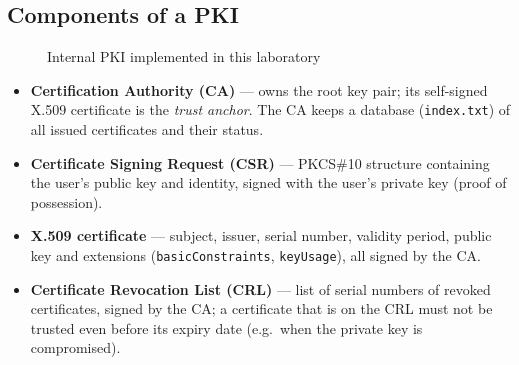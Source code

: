 \documentclass[12pt,a4paper]{article}
\begin{document}
\subsection{Components of a PKI}
\begin{figure}[H]
\centering
{}
\caption{Internal PKI implemented in this laboratory}
\end{figure}

\begin{itemize}
  \item \textbf{Certification Authority (CA)} — owns the root key pair; its self-signed X.509
        certificate is the \emph{trust anchor}. The CA keeps a database (\texttt{index.txt}) of all
        issued certificates and their status.
  \item \textbf{Certificate Signing Request (CSR)} — PKCS\#10 structure containing the user's
        public key and identity, signed with the user's private key (proof of possession).
  \item \textbf{X.509 certificate} — subject, issuer, serial number, validity period, public key and
        extensions (\texttt{basicConstraints}, \texttt{keyUsage}), all signed by the CA.
  \item \textbf{Certificate Revocation List (CRL)} — list of serial numbers of revoked
        certificates, signed by the CA; a certificate that is on the CRL must not be trusted even
        before its expiry date (e.g.\ when the private key is compromised).
\end{itemize}
\end{document}
